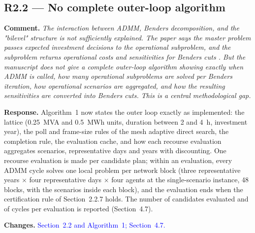 \documentclass[11pt]{article}
\newcommand{\rcomment}[1]{\par\medskip\noindent\textbf{Comment.} \textit{#1}\par\smallskip}
\newcommand{\rresponse}[1]{\noindent\textbf{Response.} #1\par\smallskip}
\newcommand{\rchanges}[1]{\noindent\textbf{Changes.} \textcolor{blue}{#1}\par\medskip}
\begin{document}
\subsection*{R2.2 --- No complete outer-loop algorithm}
\rcomment{The interaction between ADMM, Benders decomposition, and the "bilevel" structure is not sufficiently explained. The paper says the master problem passes expected investment decisions to the operational subproblem, and the subproblem returns operational costs and sensitivities for Benders cuts . But the manuscript does not give a complete outer-loop algorithm showing exactly when ADMM is called, how many operational subproblems are solved per Benders iteration, how operational scenarios are aggregated, and how the resulting sensitivities are converted into Benders cuts. This is a central methodological gap.}
\rresponse{Algorithm~1 now states the outer loop exactly as implemented: the lattice (0.25~MVA and
0.5~MWh units, duration between 2 and 4~h, investment year), the poll and frame-size rules of the mesh
adaptive direct search, the completion rule, the evaluation cache, and how each recourse evaluation
aggregates scenarios, representative days and years with discounting. One recourse evaluation is made per
candidate plan; within an evaluation, every ADMM cycle solves one local problem per network block (three
representative years $\times$ four representative days $\times$ four agents at the single-scenario
instance, 48 blocks, with the scenarios inside each block), and the evaluation ends when the certification
rule of Section~2.2.7 holds. The number of candidates evaluated and of cycles per evaluation is
reported (Section~4.7).}
\rchanges{Section~2.2 and Algorithm~1; Section~4.7.}
\end{document}
